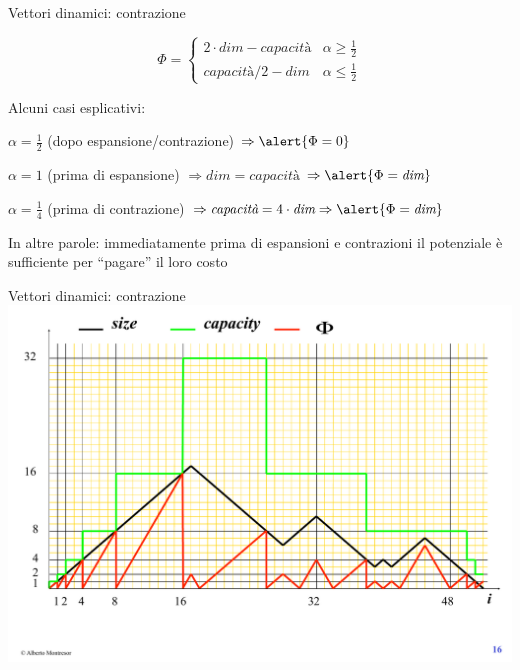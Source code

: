 \begin{frame}{Vettori dinamici: contrazione}

\begin{myboxtitle}
\[
\Phi = \begin{cases}	
2 \cdot \textit{dim} - \textit{capacità} & \alpha \geq \frac{1}{2}\\
\textit{capacità} / 2 - \textit{dim}  & \alpha \leq \frac{1}{2}
\end{cases}
\]
\end{myboxtitle}

\bigskip
Alcuni casi esplicativi:
\BI
\item $\alpha = \frac{1}{2}$ (dopo espansione/contrazione) $\Rightarrow \alert{\Phi = 0}$
\item $\alpha = 1$ (prima di espansione) $\Rightarrow \textit{dim}=\textit{capacità}$ $\Rightarrow \alert{\Phi = \textit{dim}}$
\item $\alpha = \frac{1}{4}$ (prima di contrazione) $\Rightarrow \textit{capacità} = 4 \cdot \textit{dim} \Rightarrow \alert{\Phi = \textit{dim}}$
\EI

\bigskip
In altre parole: immediatamente prima di espansioni e contrazioni il potenziale è sufficiente per “pagare” il loro costo

\end{frame}

\begin{frame}[shrink]{Vettori dinamici: contrazione}
	\includegraphics{dynvector.pdf}
\end{frame}

